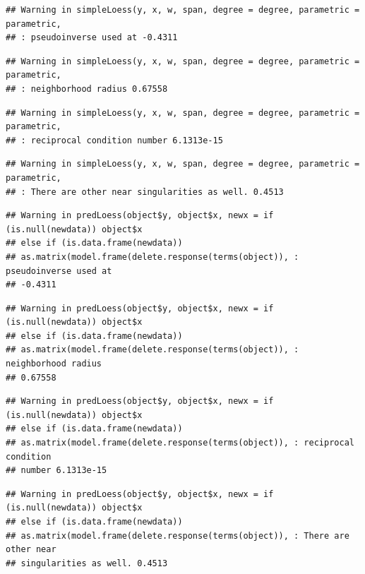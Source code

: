\documentclass[
  bookmarksnumbered]{article}
\begin{document}
\begin{verbatim}
## Warning in simpleLoess(y, x, w, span, degree = degree, parametric = parametric,
## : pseudoinverse used at -0.4311
\end{verbatim}

\begin{verbatim}
## Warning in simpleLoess(y, x, w, span, degree = degree, parametric = parametric,
## : neighborhood radius 0.67558
\end{verbatim}

\begin{verbatim}
## Warning in simpleLoess(y, x, w, span, degree = degree, parametric = parametric,
## : reciprocal condition number 6.1313e-15
\end{verbatim}

\begin{verbatim}
## Warning in simpleLoess(y, x, w, span, degree = degree, parametric = parametric,
## : There are other near singularities as well. 0.4513
\end{verbatim}

\begin{verbatim}
## Warning in predLoess(object$y, object$x, newx = if (is.null(newdata)) object$x
## else if (is.data.frame(newdata))
## as.matrix(model.frame(delete.response(terms(object)), : pseudoinverse used at
## -0.4311
\end{verbatim}

\begin{verbatim}
## Warning in predLoess(object$y, object$x, newx = if (is.null(newdata)) object$x
## else if (is.data.frame(newdata))
## as.matrix(model.frame(delete.response(terms(object)), : neighborhood radius
## 0.67558
\end{verbatim}

\begin{verbatim}
## Warning in predLoess(object$y, object$x, newx = if (is.null(newdata)) object$x
## else if (is.data.frame(newdata))
## as.matrix(model.frame(delete.response(terms(object)), : reciprocal condition
## number 6.1313e-15
\end{verbatim}

\begin{verbatim}
## Warning in predLoess(object$y, object$x, newx = if (is.null(newdata)) object$x
## else if (is.data.frame(newdata))
## as.matrix(model.frame(delete.response(terms(object)), : There are other near
## singularities as well. 0.4513
\end{verbatim}
\end{document}
